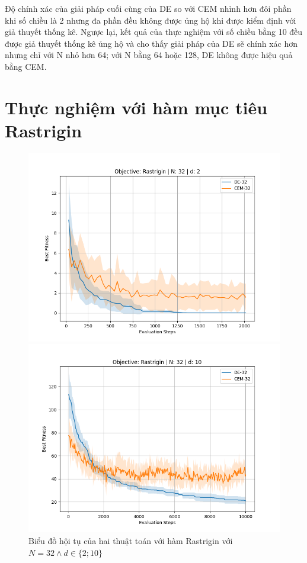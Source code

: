 \documentclass[10pt]{report}
\begin{document}
Độ chính xác của giải pháp cuối cùng của DE so với CEM nhỉnh hơn đôi phần khi số chiều là 2 nhưng đa phần đều không được ủng hộ khi được kiểm định với giả thuyết thống kê. Ngược lại, kết quả của thực nghiệm với số chiều bằng 10 đều được giả thuyết thống kê ủng hộ và cho thấy giải pháp của DE sẽ chính xác hơn nhưng chỉ với N nhỏ hơn 64; với N bằng 64 hoặc 128, DE không được hiệu quả bằng CEM.

\section{Thực nghiệm với hàm mục tiêu Rastrigin}
\begin{figure}[H]\centering
	\label{figure:rastrigin_comparison}
	\caption{Biểu đồ hội tụ của hai thuật toán với hàm Rastrigin với \(N = 32 \wedge d \in \{2; 10\}\)}
	\begin{minipage}{0.45\textwidth}\centering
		\includegraphics[width=\textwidth]{../assets/graphs/objective=Rastrigin_N=32_d=2.png}
	\end{minipage}
	\begin{minipage}{0.45\textwidth}\centering
		\includegraphics[width=\textwidth]{../assets/graphs/objective=Rastrigin_N=32_d=10.png}
	\end{minipage}
\end{figure}
\end{document}
